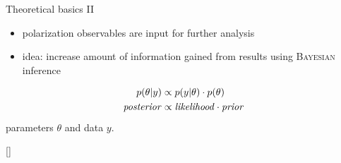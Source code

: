 \documentclass[11pt,aspectratio=169,dvipsnames]{beamer}
\newcommand{\thecolor}{black!70!blue}
\begin{document}
	\begin{frame}{Theoretical basics II}
		\addtocounter{framenumber}{-1}
	\begin{itemize}
		\item polarization observables are input for further analysis
		\item idea: increase amount of information gained from results using \textsc{Bayesian} inference 
	\end{itemize}
	\begin{tcolorbox}[colback=blue!5,colframe=\thecolor,title=\textsc{Bayes'} theorem]
		\begin{align*}
			p(\theta|y)&\propto p(y|\theta)\cdot p(\theta)\\
			\text{\emph{posterior}}&\propto\text{\emph{likelihood}}\cdot\text{\emph{prior}}
		\end{align*}
	parameters $\theta$ and data $y$.
	
	
	\begin{flushright}
		{\scriptsize[\cite{bayes}]}
	\end{flushright}
\end{tcolorbox}

	\end{frame}
\end{document}
